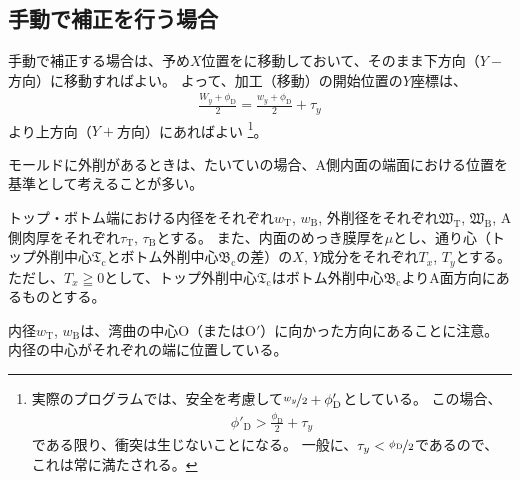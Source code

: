\subsection{手動で補正を行う場合}
手動で補正する場合は、予め$X$位置をに移動しておいて、そのまま下方向（$Y-$方向）に移動すればよい。
よって、加工（移動）の開始位置の$Y$座標は、
\begin{align*}
  \frac{W_y+\phi_\mathrm D}2 = \frac{w_y+\phi_\mathrm D}2+\tau_y
\end{align*}
より上方向（$Y+$方向）にあればよい%
\footnote{実際のプログラムでは、安全を考慮して$\nicefrac{w_y}2+\phi'_\mathrm D$としている。
この場合、
\begin{align*}
  \phi'_\mathrm D > \frac{\phi_\mathrm D}2+\tau_y
\end{align*}
である限り、衝突は生じないことになる。
一般に、$\tau_y < \nicefrac{\phi_\mathrm D}2$であるので、これは常に満たされる。}。




モールドに外削があるときは、たいていの場合、A側内面の端面における位置を基準として考えることが多い。

トップ・ボトム端における内径をそれぞれ$w_\mathrm T$, $w_\mathrm B$, 外削径をそれぞれ$\mathfrak W_\mathrm T$, $\mathfrak W_\mathrm B$, A側肉厚をそれぞれ$\tau_\mathrm T$, $\tau_\mathrm B$とする。
また、内面のめっき膜厚を$\mu$とし、通り心（トップ外削中心$\mathfrak T_\mathrm c$とボトム外削中心$\mathfrak B_\mathrm c$の差）の$X$, $Y$成分をそれぞれ$T_x$, $T_y$とする。
ただし、$T_x \geqq 0$として、トップ外削中心$\mathfrak T_\mathrm c$はボトム外削中心$\mathfrak B_\mathrm c$よりA面方向にあるものとする。
\begin{hosoku}
内径$w_\mathrm T$, $w_\mathrm B$は、湾曲の中心O（またはO$'$）に向かった方向にあることに注意。
内径の中心がそれぞれの端に位置している。
\end{hosoku}



